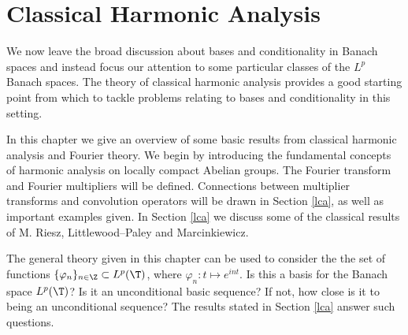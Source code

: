 \chapter{Classical Harmonic Analysis}\label{cha}

We now
leave the broad discussion about bases and conditionality in Banach spaces and
instead focus our attention to some particular classes of the $L^p$ Banach
spaces. The theory of classical harmonic analysis provides a good starting point
from which to tackle problems relating to bases and conditionality in this
setting.

In this chapter we give an overview of some basic results from classical
harmonic analysis and Fourier theory.
We begin by introducing the fundamental concepts of harmonic analysis on locally
compact Abelian groups. The Fourier transform and Fourier multipliers will be
defined. Connections between multiplier transforms and convolution operators
will
be drawn in Section \ref{lca}, as well as important examples given. In
Section \ref{lca} we discuss some of the classical results of M. Riesz,
Littlewood--Paley and Marcinkiewicz.

The general theory given in this chapter can be used to consider the
the set of functions $\{\varphi_n\}_{n\in\Z}\subset L^p(\T)$, where
$\varphi_n:t\mapsto e^{int}$. Is this a basis for the Banach space $L^p(\T)$?
Is it an unconditional basic sequence? If not, how close is it
to being an unconditional sequence? The results stated in Section
\ref{lca}
answer such questions.
